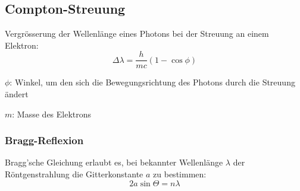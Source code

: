 	\subsection{Compton-Streuung} %
		Vergrösserung der Wellenlänge eines Photons bei der Streuung an einem Elektron:
		\[
			\Delta \lambda = \frac{h}{mc} (1 - \cos \phi)
		\]
		\begin{tightitemize}
			\item[$\phi$:] Winkel, um den sich die Bewegungsrichtung des Photons durch die Streuung ändert
			\item[$m$:] Masse des Elektrons
		\end{tightitemize}

	\subsubsection{Bragg-Reflexion} %
		Bragg'sche Gleichung erlaubt es, bei bekannter Wellenlänge $\lambda$ der
		Röntgenstrahlung die Gitterkonstante $a$ zu bestimmen:
		\[
			2 a \sin \Theta = n \lambda
		\]













































